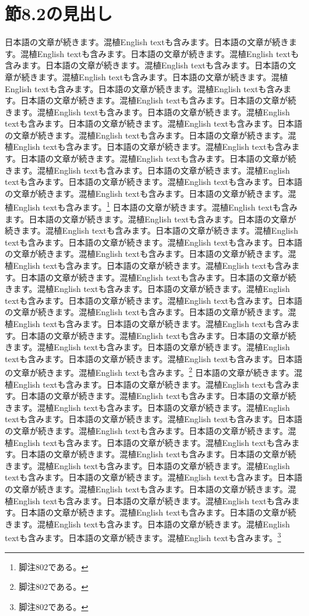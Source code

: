 \documentclass[pdflatex,book]{jlreq}
\begin{document}
\section{節8.2の見出し}
日本語の文章が続きます。混植English textも含みます。日本語の文章が続きます。混植English textも含みます。日本語の文章が続きます。混植English textも含みます。日本語の文章が続きます。混植English textも含みます。日本語の文章が続きます。混植English textも含みます。日本語の文章が続きます。混植English textも含みます。日本語の文章が続きます。混植English textも含みます。日本語の文章が続きます。混植English textも含みます。日本語の文章が続きます。混植English textも含みます。日本語の文章が続きます。混植English textも含みます。日本語の文章が続きます。混植English textも含みます。日本語の文章が続きます。混植English textも含みます。日本語の文章が続きます。混植English textも含みます。日本語の文章が続きます。混植English textも含みます。日本語の文章が続きます。混植English textも含みます。日本語の文章が続きます。混植English textも含みます。日本語の文章が続きます。混植English textも含みます。日本語の文章が続きます。混植English textも含みます。日本語の文章が続きます。混植English textも含みます。日本語の文章が続きます。混植English textも含みます。\footnote{脚注802である。}
日本語の文章が続きます。混植English textも含みます。日本語の文章が続きます。混植English textも含みます。日本語の文章が続きます。混植English textも含みます。日本語の文章が続きます。混植English textも含みます。日本語の文章が続きます。混植English textも含みます。日本語の文章が続きます。混植English textも含みます。日本語の文章が続きます。混植English textも含みます。日本語の文章が続きます。混植English textも含みます。日本語の文章が続きます。混植English textも含みます。日本語の文章が続きます。混植English textも含みます。日本語の文章が続きます。混植English textも含みます。日本語の文章が続きます。混植English textも含みます。日本語の文章が続きます。混植English textも含みます。日本語の文章が続きます。混植English textも含みます。日本語の文章が続きます。混植English textも含みます。日本語の文章が続きます。混植English textも含みます。日本語の文章が続きます。混植English textも含みます。日本語の文章が続きます。混植English textも含みます。日本語の文章が続きます。混植English textも含みます。日本語の文章が続きます。混植English textも含みます。\footnote{脚注802である。}
日本語の文章が続きます。混植English textも含みます。日本語の文章が続きます。混植English textも含みます。日本語の文章が続きます。混植English textも含みます。日本語の文章が続きます。混植English textも含みます。日本語の文章が続きます。混植English textも含みます。日本語の文章が続きます。混植English textも含みます。日本語の文章が続きます。混植English textも含みます。日本語の文章が続きます。混植English textも含みます。日本語の文章が続きます。混植English textも含みます。日本語の文章が続きます。混植English textも含みます。日本語の文章が続きます。混植English textも含みます。日本語の文章が続きます。混植English textも含みます。日本語の文章が続きます。混植English textも含みます。日本語の文章が続きます。混植English textも含みます。日本語の文章が続きます。混植English textも含みます。日本語の文章が続きます。混植English textも含みます。日本語の文章が続きます。混植English textも含みます。日本語の文章が続きます。混植English textも含みます。日本語の文章が続きます。混植English textも含みます。日本語の文章が続きます。混植English textも含みます。\footnote{脚注802である。}
\end{document}

